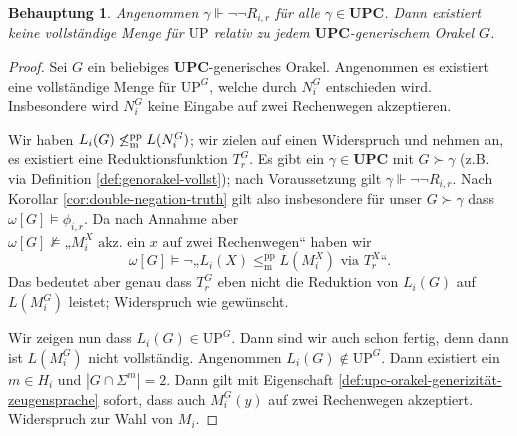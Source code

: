 \documentclass[nofonts]{uebung}
\newtheorem{claim}[theorem]{Behauptung}
\theoremstyle{definition}
\def\UP{\ensuremath{\mathrm{UP}}}
\DeclareMathOperator{\dom}{dom}
\def\leqmpp{\ensuremath{\leq_\mathrm{m}^\mathrm{pp}}}
\begin{document}
\begin{claim}\label{claim:upc-forcing-ausreichend}
    Angenommen $\gamma\Vdash\neg\neg  R_{i,r}$ für alle $\gamma\in\mathbf{UPC}$.
    Dann existiert keine vollständige Menge für $\UP$ relativ zu jedem $\mathbf{UPC}$-generischem Orakel $G$.
\end{claim}
\begin{proof}
    Sei $G$ ein beliebiges $\mathbf{UPC}$-generisches Orakel.
    Angenommen es existiert eine vollständige Menge für $\UP^G$, welche durch $N^G_i$ entschieden wird.
    Insbesondere wird $N^G_i$ keine Eingabe auf zwei Rechenwegen akzeptieren.

    Wir haben $L_i(G)\not\leqmpp L(N^G_i)$; wir zielen auf einen Widerspruch und nehmen an, es existiert eine Reduktionsfunktion $T_r^G$.
    Es gibt ein $\gamma\in\mathbf{UPC}$ mit $G\succ\gamma$ (z.B. via Definition \ref{def:genorakel-vollst}); nach Voraussetzung gilt $\gamma\Vdash\neg\neg  R_{i,r}$.
    Nach Korollar \ref{cor:double-negation-truth} gilt also insbesondere für unser $G\succ\gamma$ dass $\omega[G] \vDash \phi_{i, r}$.
    Da nach Annahme aber $\omega[G] \not\vDash \text{„$M_i^X$ akz. ein $x$ auf zwei Rechenwegen“}$ haben wir
    \[ \omega[G] \vDash  \neg„L_{i}(X)\leqmpp L(M_i^X)\text{ via }T^X_r“. \]
    Das bedeutet aber genau dass $T^G_r$ eben nicht die Reduktion von $L_{i}(G)$ auf $L(M_i^G)$ leistet; Widerspruch wie gewünscht.

    Wir zeigen nun dass $L_i(G)\in\UP^G$. Dann sind wir auch schon fertig, denn dann ist $L(M_i^G)$ nicht vollständig.
    Angenommen $L_i(G)\not\in\UP^G$. Dann existiert ein $m\in H_i$ und $|G\cap \Sigma^m|= 2$.
    Dann gilt mit Eigenschaft \ref{def:upc-orakel-generizität-zeugensprache} sofort, dass auch $M_i^G(y)$ auf zwei Rechenwegen akzeptiert.
    Widerspruch zur Wahl von $M_i$.
\end{proof}
\end{document}
